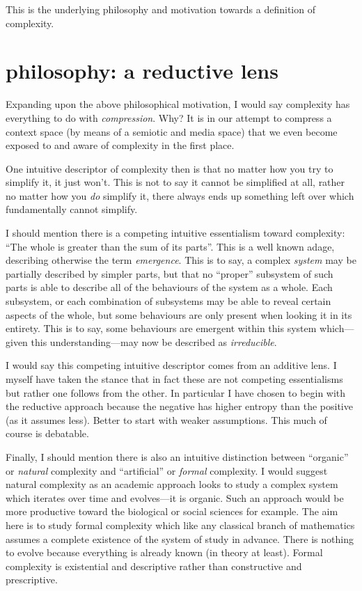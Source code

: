 \documentclass[twoside]{article}
\begin{document}
This is the underlying philosophy and motivation towards a definition of complexity.

\section*{philosophy: a reductive lens}

Expanding upon the above philosophical motivation, I would say complexity has everything to do with \emph{compression}.
Why? It is in our attempt to compress a context space (by means of a semiotic and media space) that we even become exposed
to and aware of complexity in the first place.

One intuitive descriptor of complexity then is that no matter how you try to simplify it, it just won't. This is not to
say it cannot be simplified at all, rather no matter how you \emph{do} simplify it, there always ends up something left over
which fundamentally cannot simplify.

I should mention there is a competing intuitive essentialism toward complexity: ``The whole is greater than the sum of its parts''.
This is a well known adage, describing otherwise the term \emph{emergence}. This is to say, a complex \emph{system} may be
partially described by simpler parts, but that no ``proper'' subsystem of such parts is able to describe all of the behaviours
of the system as a whole. Each subsystem, or each combination of subsystems may be able to reveal certain aspects of the whole,
but some behaviours are only present when looking it in its entirety. This is to say, some behaviours are emergent
within this system which---given this understanding---may now be described as \emph{irreducible}.

I would say this competing intuitive descriptor comes from an additive lens. I myself have taken the stance that in fact
these are not competing essentialisms but rather one follows from the other. In particular I have chosen to begin with the
reductive approach because the negative has higher entropy than the positive (as it assumes less). Better to start with
weaker assumptions. This much of course is debatable.

Finally, I should mention there is also an intuitive distinction between ``organic'' or \emph{natural} complexity
and ``artificial'' or \emph{formal} complexity. I would suggest natural complexity as an academic approach looks to study
a complex system which iterates over time and evolves---it is organic. Such an approach would be more productive toward
the biological or social sciences for example. The aim here is to study formal complexity which like any classical branch
of mathematics assumes a complete existence of the system of study in advance. There is nothing to evolve because everything
is already known (in theory at least). Formal complexity is existential and descriptive rather than constructive and prescriptive.
\end{document}
